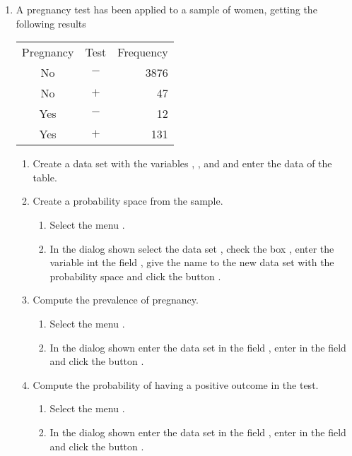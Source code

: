 \begin{enumerate}[leftmargin=*]
\item A pregnancy test has been applied to a sample of women, getting the following results
\begin{center}
\begin{tabular}{ccr}
\toprule
Pregnancy & Test & Frequency\\ 
No & $-$ & 3876\\
No & $+$ & 47\\
Yes & $-$ & 12\\
Yes & $+$ & 131\\
\bottomrule
\end{tabular}
\end{center}

\begin{enumerate}
\item Create a data set  with the variables , , and  and enter the data of the table.

\item Create a probability space from the sample. 
\begin{indication}
\begin{enumerate}
\item Select the menu .
\item In the dialog shown select the data set , check the box
, enter the variable  int the field , give the name 
 to the new data set with the probability space and click the button .
\end{enumerate}
\end{indication}  

\item Compute the prevalence of pregnancy.
\begin{indication}
\begin{enumerate}
\item Select the menu .
\item In the dialog shown enter the data set  in the field , enter
 in the field  and click the button .
\end{enumerate}
\end{indication} 

\item Compute the probability of having a positive outcome in the test.
\begin{indication}
\begin{enumerate}
\item Select the menu .
\item In the dialog shown enter the data set  in the field , enter
 in the field  and click the button .
\end{enumerate}
\end{indication} 


\end{enumerate}
\end{enumerate}
